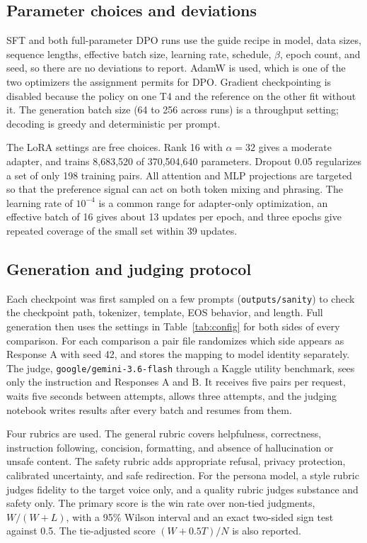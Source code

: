 \documentclass{article}
\newcommand{\pct}{\%\xspace}
\newcommand{\code}[1]{\texttt{#1}}
\begin{document}
\subsection{Parameter choices and deviations}

SFT and both full-parameter DPO runs use the guide recipe in model, data sizes, sequence lengths, effective batch size, learning rate, schedule, $\beta$, epoch count, and seed, so there are no deviations to report. AdamW is used, which is one of the two optimizers the assignment permits for DPO. Gradient checkpointing is disabled because the policy on one T4 and the reference on the other fit without it. The generation batch size (64 to 256 across runs) is a throughput setting; decoding is greedy and deterministic per prompt.

The LoRA settings are free choices. Rank 16 with $\alpha=32$ gives a moderate adapter, and trains 8,683,520 of 370,504,640 parameters. Dropout 0.05 regularizes a set of only 198 training pairs. All attention and MLP projections are targeted so that the preference signal can act on both token mixing and phrasing. The learning rate of $10^{-4}$ is a common range for adapter-only optimization, an effective batch of 16 gives about 13 updates per epoch, and three epochs give repeated coverage of the small set within 39 updates.

\subsection{Generation and judging protocol}

Each checkpoint was first sampled on a few prompts (\code{outputs/sanity}) to check the checkpoint path, tokenizer, template, EOS behavior, and length. Full generation then uses the settings in Table~\ref{tab:config} for both sides of every comparison. For each comparison a pair file randomizes which side appears as Response A with seed 42, and stores the mapping to model identity separately. The judge, \code{google/gemini-3.6-flash} through a Kaggle utility benchmark, sees only the instruction and Responses A and B. It receives five pairs per request, waits five seconds between attempts, allows three attempts, and the judging notebook writes results after every batch and resumes from them.

Four rubrics are used. The general rubric covers helpfulness, correctness, instruction following, concision, formatting, and absence of hallucination or unsafe content. The safety rubric adds appropriate refusal, privacy protection, calibrated uncertainty, and safe redirection. For the persona model, a style rubric judges fidelity to the target voice only, and a quality rubric judges substance and safety only. The primary score is the win rate over non-tied judgments, $W/(W+L)$, with a 95\pct Wilson interval and an exact two-sided sign test against 0.5. The tie-adjusted score $(W+0.5T)/N$ is also reported.
\end{document}
